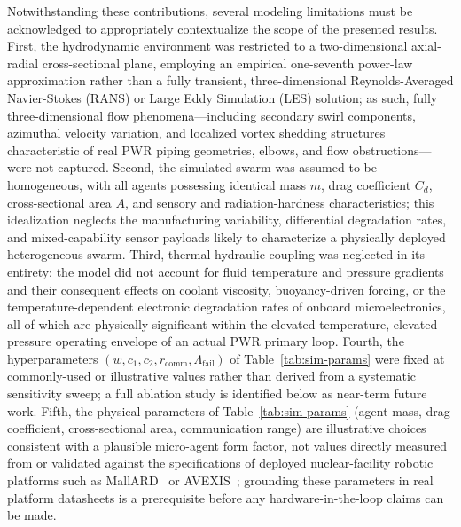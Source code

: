 \documentclass[journal]{IEEEtran}
\begin{document}
Notwithstanding these contributions, several modeling limitations must be acknowledged to appropriately contextualize the scope of the presented results. First, the hydrodynamic environment was restricted to a two-dimensional axial-radial cross-sectional plane, employing an empirical one-seventh power-law approximation rather than a fully transient, three-dimensional Reynolds-Averaged Navier-Stokes (RANS) or Large Eddy Simulation (LES) solution; as such, fully three-dimensional flow phenomena---including secondary swirl components, azimuthal velocity variation, and localized vortex shedding structures characteristic of real PWR piping geometries, elbows, and flow obstructions---were not captured. Second, the simulated swarm was assumed to be homogeneous, with all agents possessing identical mass $m$, drag coefficient $C_d$, cross-sectional area $A$, and sensory and radiation-hardness characteristics; this idealization neglects the manufacturing variability, differential degradation rates, and mixed-capability sensor payloads likely to characterize a physically deployed heterogeneous swarm. Third, thermal-hydraulic coupling was neglected in its entirety: the model did not account for fluid temperature and pressure gradients and their consequent effects on coolant viscosity, buoyancy-driven forcing, or the temperature-dependent electronic degradation rates of onboard microelectronics, all of which are physically significant within the elevated-temperature, elevated-pressure operating envelope of an actual PWR primary loop. Fourth, the hyperparameters $(w, c_1, c_2, r_{\text{comm}}, \Lambda_{\text{fail}})$ of Table~\ref{tab:sim-params} were fixed at commonly-used or illustrative values rather than derived from a systematic sensitivity sweep; a full ablation study is identified below as near-term future work. Fifth, the physical parameters of Table~\ref{tab:sim-params} (agent mass, drag coefficient, cross-sectional area, communication range) are illustrative choices consistent with a plausible micro-agent form factor, not values directly measured from or validated against the specifications of deployed nuclear-facility robotic platforms such as MallARD~\cite{groves_mallard} or AVEXIS~\cite{nancekievill_avexis}; grounding these parameters in real platform datasheets is a prerequisite before any hardware-in-the-loop claims can be made.
\end{document}
